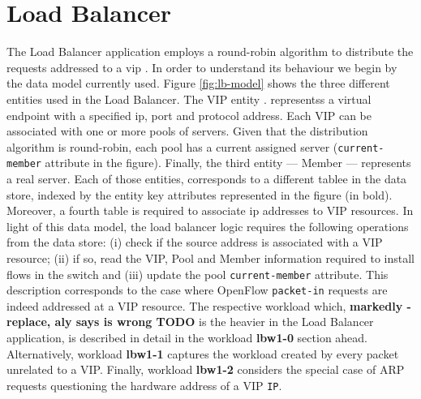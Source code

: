 \documentclass[12pt,openright,twoside]{report}
\begin{document}

\label{cenas}


\section{Load Balancer}
\label{sec:feasibility:lb}
\glsresetall

The Load Balancer application employs a round-robin algorithm to distribute the
requests addressed to a \gls{vip} . In order to
understand its behaviour we begin by the data model currently used. Figure
\ref{fig:lb-model} shows the three different entities used in the Load
Balancer. The  VIP entity .
representss   a virtual endpoint with a specified \gls{ip}, port and
protocol address. Each VIP can be associated with one or more pools
of 
servers. Given that the distribution algorithm is round-robin, each pool
has a current assigned server (\texttt{current-member} attribute in the figure). Finally, the third entity --- Member
--- represents a real server. Each of those entities, corresponds
to a different tablee  in the data store, indexed by the entity
key attributes represented in the figure (in bold). Moreover, a fourth table is
required to associate \gls{ip} addresses to VIP resources. In light of
this data model, the load balancer logic requires the following
operations from the data store: (i) check if the source address is
associated with a VIP resource; (ii) if so, read the VIP, Pool and
Member information required to install flows in the switch and (iii)
update the pool \texttt{current-member} attribute. This description corresponds to the case where OpenFlow
\texttt{packet-in} requests are indeed addressed at a VIP
resource. The respective workload which, \textbf{markedly - replace,
  aly says is wrong TODO} is the heavier in
the Load Balancer application, is described in detail in the workload
\textbf{lbw1-0} section ahead. Alternatively, workload
\textbf{lbw1-1} captures the workload created by every
packet unrelated to a VIP. Finally, workload \textbf{lbw1-2}
considers the special case of ARP requests questioning the hardware
address of a VIP \texttt{IP}.
\end{document}
